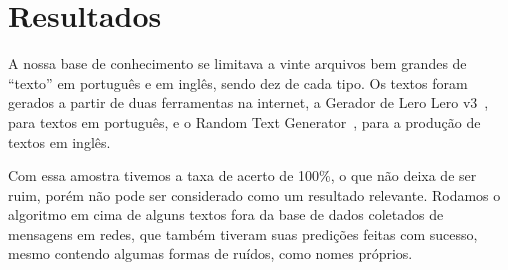 \section{Resultados}
A nossa base de conhecimento se limitava a vinte arquivos bem grandes de “texto” em português e em inglês, sendo dez de cada tipo. Os textos foram gerados a partir de duas ferramentas na internet, a Gerador de Lero Lero v3~\cite{site:lero}, para textos em português, e o Random Text Generator~\cite{site:rtg}, para a produção de textos em inglês.

Com essa amostra tivemos a taxa de acerto de 100\%, o que não deixa de ser ruim, porém não pode ser considerado como um resultado relevante. Rodamos o algoritmo em cima de alguns textos fora da base de dados coletados de mensagens em redes, que também tiveram suas predições feitas com sucesso, mesmo contendo algumas formas de ruídos, como nomes próprios.